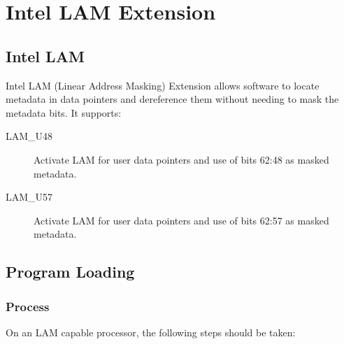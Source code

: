 \chapter{Intel LAM Extension}

\section{Intel LAM}

Intel LAM (Linear Address Masking) Extension allows software to locate
metadata in data pointers and dereference them without needing to mask
the metadata bits.  It supports:

\begin{description}
  \item[LAM_U48] Activate LAM for user data pointers and use of bits
    62:48 as masked metadata.
  \item[LAM_U57] Activate LAM for user data pointers and use of bits
    62:57 as masked metadata.
\end{description}

\section{Program Loading}

\subsection{Process }
\label{lam_u48}

On an LAM capable processor, the following steps should be taken:

